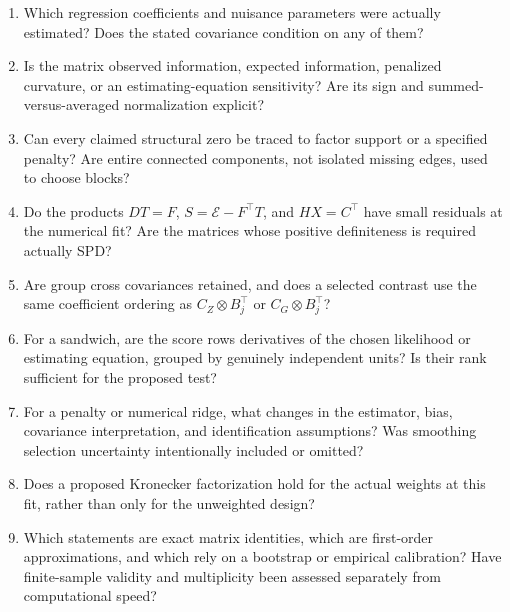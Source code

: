 \begin{enumerate}
 \item Which regression coefficients and nuisance parameters were actually
 estimated?  Does the stated covariance condition on any of them?
 \item Is the matrix observed information, expected information,
 penalized curvature, or an estimating-equation sensitivity?  Are its
 sign and summed-versus-averaged normalization explicit?
 \item Can every claimed structural zero be traced to factor support or a
 specified penalty?  Are entire connected components, not isolated
 missing edges, used to choose blocks?
 \item Do the products $DT=F$, $S=\mathcal E-F^\top T$, and
 $HX=C^\top$ have small residuals at the numerical fit?  Are the
 matrices whose positive definiteness is required actually SPD?
 \item Are group cross covariances retained, and does a selected contrast
 use the same coefficient ordering as $C_Z\otimes B_j^\top$ or
 $C_G\otimes B_j^\top$?
 \item For a sandwich, are the score rows derivatives of the chosen
 likelihood or estimating equation, grouped by genuinely independent
 units?  Is their rank sufficient for the proposed test?
 \item For a penalty or numerical ridge, what changes in the estimator,
 bias, covariance interpretation, and identification assumptions?
 Was smoothing selection uncertainty intentionally included or omitted?
 \item Does a proposed Kronecker factorization hold for the actual
 weights at this fit, rather than only for the unweighted design?
 \item Which statements are exact matrix identities, which are
 first-order approximations, and which rely on a bootstrap or empirical
 calibration?  Have finite-sample validity and multiplicity been assessed
 separately from computational speed?
\end{enumerate}
